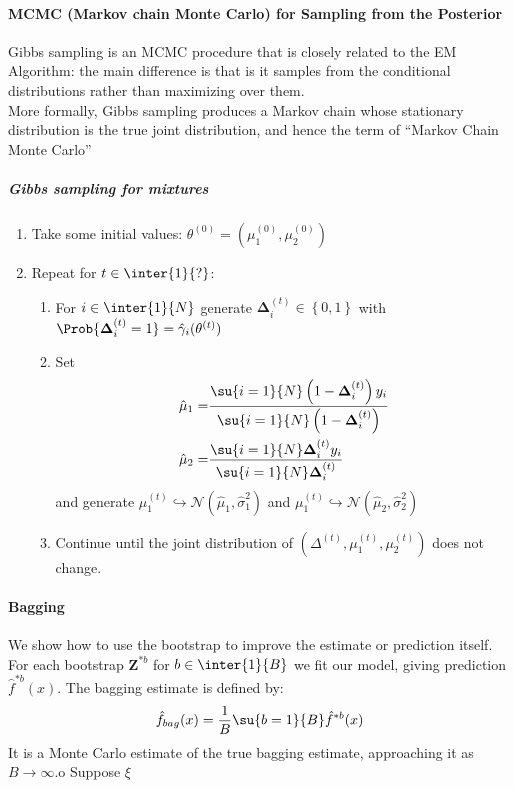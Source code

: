 \paragraph{MCMC (Markov chain Monte Carlo) for Sampling from the Posterior}
Gibbs sampling  is an MCMC procedure that is closely related to the EM Algorithm: the main 
difference  is that is it samples from the conditional distributions rather than maximizing over 
them. \\
More formally, Gibbs sampling produces a Markov chain whose stationary distribution is the 
true joint distribution, and hence the term of ``Markov Chain Monte Carlo''
\subparagraph{Gibbs sampling for mixtures}
\begin{enumerate}
	\item Take some initial values: $\theta^{(0)}=(\mu_{1}^{(0)}, \mu_{2}^{(0)})$
	\item Repeat for $t\in\inter{1}{?}$:
		\begin{enumerate}[label=(\alph*)]
			\item For $i\in\inter{1}{N}$ generate $\bm{\Delta}_{i}^{(t)}\in\left\{0,1
				\right\}$ with $\Prob{\bm{\Delta}_{i}^{(t)}=1}=\hat{\gamma}_{i}(
				\theta^{(t)})$
			\item Set
				\begin{align*}
					\hat{\mu}_{1} = & \dfrac{\su{{i=1}}{N}\left(1-\bm{\Delta}_{i}^{(t)}\right)y_{i}}{\su{{i=1}}{N}\left(1-\bm{\Delta}_{i}^{(t)}\right)}\\
					\hat{\mu}_{2} = & \dfrac{\su{{i=1}}{N}\bm{\Delta}_{i}^{(t)}y_{i}}{\su{{i=1}}{N}\bm{\Delta}_{i}^{(t)}}
				\end{align*}
					and generate $\mu_{1}^{(t)}\hookrightarrow\mathcal{N}(\hat{\mu}_{1}, \hat{\sigma}_{1}^{2})$ and $\mu_{1}^{(t)}\hookrightarrow\mathcal{N}(\hat{\mu}_{2},
					\hat{\sigma}_{2}^{2})$
			\item Continue until the joint distribution of $\left(\Delta^{(t)},\mu_{1}^{(t)}, \mu_{2}^{(t)}\right)$ does not change.
		\end{enumerate}
\end{enumerate}

\paragraph{Bagging}
We show how to use the bootstrap to improve the estimate or prediction itself.\\
For each bootstrap $\bm{Z}^{*b}$ for $b\in\inter{1}{B}$ we fit our model, giving prediction
$\hat{f}^{*b}(x)$. The bagging estimate is defined by:
$$ \hat{f}_{bag}(x) = \dfrac{1}{B}\su{{b=1}}{B}\hat{f}^{*b}(x)$$
It is a Monte Carlo estimate of the true bagging estimate, approaching it as $B\rightarrow \infty$.o
Suppose $\xi$
